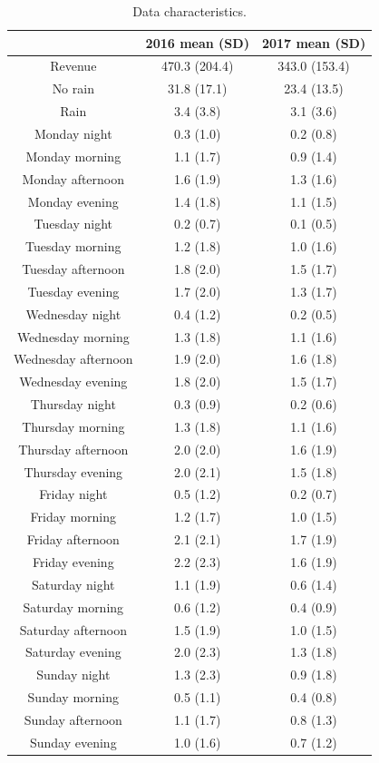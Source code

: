 \documentclass[twoside,11pt]{article}
\begin{document}
\begin{table}[H]
    \centering
    \begin{tabular}{c|c|c}
         & 2016 mean (SD) & 2017 mean (SD)\\
         \hline
        Revenue & 470.3 (204.4) & 343.0 (153.4)\\
        No rain & 31.8 (17.1) & 23.4 (13.5)\\
        Rain & 3.4 (3.8) & 3.1 (3.6)\\
        Monday night & 0.3 (1.0) & 0.2 (0.8)\\
        Monday morning & 1.1 (1.7) & 0.9 (1.4)\\
        Monday afternoon & 1.6 (1.9) & 1.3 (1.6)\\
        Monday evening & 1.4 (1.8) & 1.1 (1.5)\\
        Tuesday night & 0.2 (0.7) & 0.1 (0.5)\\
        Tuesday morning & 1.2 (1.8) & 1.0 (1.6)\\
        Tuesday afternoon & 1.8 (2.0) & 1.5 (1.7)\\
        Tuesday evening & 1.7 (2.0) & 1.3 (1.7)\\
        Wednesday night & 0.4 (1.2) & 0.2 (0.5)\\
        Wednesday morning & 1.3 (1.8) & 1.1 (1.6)\\
        Wednesday afternoon & 1.9 (2.0) & 1.6 (1.8)\\
        Wednesday evening & 1.8 (2.0) & 1.5 (1.7)\\
        Thursday night & 0.3 (0.9) & 0.2 (0.6)\\
        Thursday morning & 1.3 (1.8) & 1.1 (1.6)\\
        Thursday afternoon & 2.0 (2.0) & 1.6 (1.9)\\
        Thursday evening & 2.0 (2.1) & 1.5 (1.8)\\
        Friday night & 0.5 (1.2) & 0.2 (0.7)\\
        Friday morning & 1.2 (1.7) & 1.0 (1.5)\\
        Friday afternoon & 2.1 (2.1) & 1.7 (1.9)\\
        Friday evening & 2.2 (2.3) & 1.6 (1.9)\\
        Saturday night & 1.1 (1.9) & 0.6 (1.4)\\
        Saturday morning & 0.6 (1.2) & 0.4 (0.9)\\
        Saturday afternoon & 1.5 (1.9) & 1.0 (1.5)\\
        Saturday evening & 2.0 (2.3) & 1.3 (1.8)\\
        Sunday night & 1.3 (2.3) & 0.9 (1.8)\\
        Sunday morning & 0.5 (1.1) & 0.4 (0.8)\\
        Sunday afternoon & 1.1 (1.7) & 0.8 (1.3)\\
        Sunday evening & 1.0 (1.6) & 0.7 (1.2)
    \end{tabular}
    \caption{Data characteristics.}
    \label{tab:data_characteristics1}
\end{table}
\end{document}
